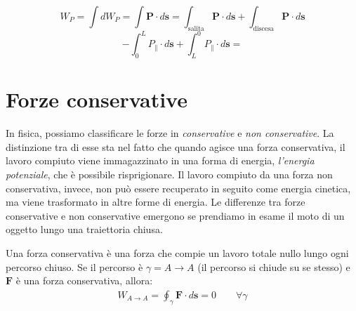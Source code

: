 \[ W_P = \int dW_P = \int \mathbf{P}\cdot d\mathbf{s} = \int_\text{salita} \mathbf{P}\cdot d\mathbf{s} + \int_\text{discesa} \mathbf{P}\cdot d\mathbf{s} \]
\[ - \int_{0}^{L}P_\parallel\cdot d\mathbf{s} + \int_{L}^{0}P_\parallel\cdot d\mathbf{s} =  \]

\section{Forze conservative}
In fisica, possiamo classificare le forze in \textit{conservative} e \textit{non
conservative}. La distinzione tra di esse sta nel fatto che quando agisce una
forza conservativa, il lavoro compiuto viene immagazzinato in una forma di energia,
\textit{l'energia potenziale}, che è possibile risprigionare. Il lavoro compiuto
da una forza non conservativa, invece, non può essere recuperato in seguito come
energia cinetica, ma viene trasformato in altre forme di energia. Le differenze tra
forze conservative e non conservative emergono se prendiamo in esame il moto di un
oggetto lungo una traiettoria chiusa.

\vspace{8pt}
\begin{tcolorbox}[colback = red!30, colframe = red!30!black, title = {Forza conservativa (condizione I)}]
    Una forza conservativa è una forza che compie un lavoro totale nullo lungo ogni
    percorso chiuso. Se il percorso è $\gamma = A\to A$ (il percorso si chiude su
    se stesso) e $\mathbf{F}$ è una forza conservativa, allora:
    \begin{align}
        W_{A \to A} = \oint_\gamma \mathbf{F} \cdot d\mathbf{s} = 0 \qquad \forall \gamma
    \end{align}
\end{tcolorbox}
\vspace{5pt}

